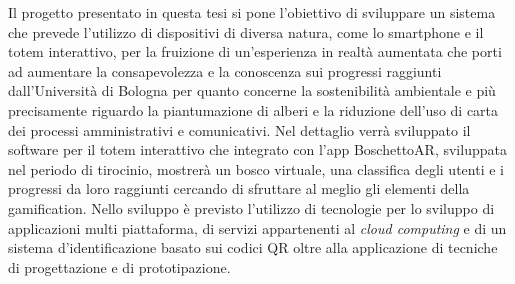 Il progetto presentato in questa tesi si pone l'obiettivo di sviluppare un sistema che prevede l'utilizzo di dispositivi di diversa natura, come lo smartphone e il totem interattivo, per la fruizione di un'esperienza in realtà aumentata che porti ad aumentare la consapevolezza e la conoscenza sui progressi raggiunti dall'Università di Bologna per quanto concerne la sostenibilità ambientale e più precisamente riguardo la piantumazione di alberi e la riduzione dell'uso di carta dei processi amministrativi e comunicativi.
Nel dettaglio verrà sviluppato il software per il totem interattivo che integrato con l'app BoschettoAR, sviluppata nel periodo di tirocinio, mostrerà un bosco virtuale, una classifica degli utenti e i progressi da loro raggiunti cercando di sfruttare al meglio gli elementi della gamification. Nello sviluppo è previsto l'utilizzo di tecnologie per lo sviluppo di applicazioni multi piattaforma, di servizi appartenenti al \textit{cloud computing} e di un sistema d'identificazione basato sui codici QR oltre alla applicazione di tecniche di progettazione e di prototipazione.

